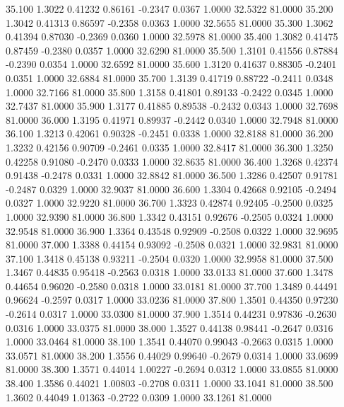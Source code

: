   35.100   1.3022   0.41232   0.86161  -0.2347   0.0367   1.0000  32.5322  81.0000
  35.200   1.3042   0.41313   0.86597  -0.2358   0.0363   1.0000  32.5655  81.0000
  35.300   1.3062   0.41394   0.87030  -0.2369   0.0360   1.0000  32.5978  81.0000
  35.400   1.3082   0.41475   0.87459  -0.2380   0.0357   1.0000  32.6290  81.0000
  35.500   1.3101   0.41556   0.87884  -0.2390   0.0354   1.0000  32.6592  81.0000
  35.600   1.3120   0.41637   0.88305  -0.2401   0.0351   1.0000  32.6884  81.0000
  35.700   1.3139   0.41719   0.88722  -0.2411   0.0348   1.0000  32.7166  81.0000
  35.800   1.3158   0.41801   0.89133  -0.2422   0.0345   1.0000  32.7437  81.0000
  35.900   1.3177   0.41885   0.89538  -0.2432   0.0343   1.0000  32.7698  81.0000
  36.000   1.3195   0.41971   0.89937  -0.2442   0.0340   1.0000  32.7948  81.0000
  36.100   1.3213   0.42061   0.90328  -0.2451   0.0338   1.0000  32.8188  81.0000
  36.200   1.3232   0.42156   0.90709  -0.2461   0.0335   1.0000  32.8417  81.0000
  36.300   1.3250   0.42258   0.91080  -0.2470   0.0333   1.0000  32.8635  81.0000
  36.400   1.3268   0.42374   0.91438  -0.2478   0.0331   1.0000  32.8842  81.0000
  36.500   1.3286   0.42507   0.91781  -0.2487   0.0329   1.0000  32.9037  81.0000
  36.600   1.3304   0.42668   0.92105  -0.2494   0.0327   1.0000  32.9220  81.0000
  36.700   1.3323   0.42874   0.92405  -0.2500   0.0325   1.0000  32.9390  81.0000
  36.800   1.3342   0.43151   0.92676  -0.2505   0.0324   1.0000  32.9548  81.0000
  36.900   1.3364   0.43548   0.92909  -0.2508   0.0322   1.0000  32.9695  81.0000
  37.000   1.3388   0.44154   0.93092  -0.2508   0.0321   1.0000  32.9831  81.0000
  37.100   1.3418   0.45138   0.93211  -0.2504   0.0320   1.0000  32.9958  81.0000
  37.500   1.3467   0.44835   0.95418  -0.2563   0.0318   1.0000  33.0133  81.0000
  37.600   1.3478   0.44654   0.96020  -0.2580   0.0318   1.0000  33.0181  81.0000
  37.700   1.3489   0.44491   0.96624  -0.2597   0.0317   1.0000  33.0236  81.0000
  37.800   1.3501   0.44350   0.97230  -0.2614   0.0317   1.0000  33.0300  81.0000
  37.900   1.3514   0.44231   0.97836  -0.2630   0.0316   1.0000  33.0375  81.0000
  38.000   1.3527   0.44138   0.98441  -0.2647   0.0316   1.0000  33.0464  81.0000
  38.100   1.3541   0.44070   0.99043  -0.2663   0.0315   1.0000  33.0571  81.0000
  38.200   1.3556   0.44029   0.99640  -0.2679   0.0314   1.0000  33.0699  81.0000
  38.300   1.3571   0.44014   1.00227  -0.2694   0.0312   1.0000  33.0855  81.0000
  38.400   1.3586   0.44021   1.00803  -0.2708   0.0311   1.0000  33.1041  81.0000
  38.500   1.3602   0.44049   1.01363  -0.2722   0.0309   1.0000  33.1261  81.0000
